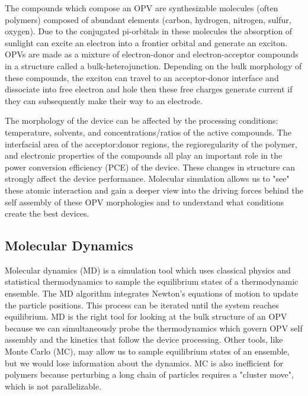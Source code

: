 The compounds which compose an OPV are synthesizable molecules (often polymers) composed of abundant elements (carbon, hydrogen, nitrogen, sulfur, oxygen).
Due to the conjugated pi-orbitals in these molecules the absorption of sunlight can excite an electron into a frontier orbital and generate an exciton.
OPVs are made as a mixture of electron-donor and electron-acceptor compounds in a structure called a bulk-heterojunction.
Depending on the bulk morphology of these compounds, the exciton can travel to an acceptor-donor interface and dissociate into free electron and hole then these free charges generate current if they can subsequently make their way to an electrode.

The morphology of the device can be affected by the processing conditions: temperature, solvents, and concentrations/ratios of the active compounds\cite{Ma2005,Hoppe2004a,Li2007}.
The interfacial area of the acceptor:donor regions\cite{Mazzio2015}, the regioregularity of the polymer\cite{Kim2006}, and electronic properties of the compounds\cite{Scharber2006a} all play an important role in the power conversion efficiency (PCE) of the device. 
These changes in structure can strongly affect the device performance.
Molecular simulation allows us to "see" these atomic interaction and gain a deeper view into the driving forces behind the self assembly of these OPV morphologies and to understand what conditions create the best devices.

\subsection*{Molecular Dynamics}
Molecular dynamics (MD) is a simulation tool which uses classical physics and statistical thermodynamics to sample the equilibrium states of a thermodynamic ensemble.
The MD algorithm integrates Newton's equations of motion to update the particle positions.
This process can be iterated until the system reaches equilibrium.
MD is the right tool for looking at the bulk structure of an OPV because we can simultaneously probe the thermodynamics which govern OPV self assembly and the kinetics that follow the device processing.
Other tools, like Monte Carlo (MC), may allow us to sample equilibrium states of an ensemble, but we would lose information about the dynamics.
MC is also inefficient for polymers because perturbing a long chain of particles requires a "cluster move", which is not parallelizable.

